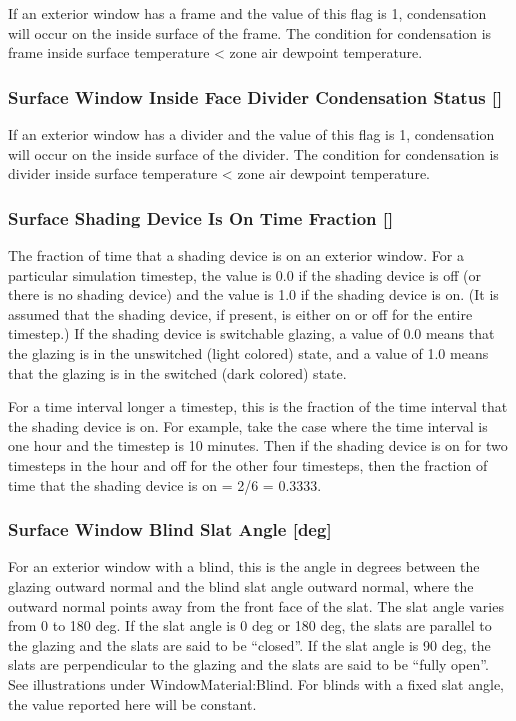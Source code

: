 If an exterior window has a frame and the value of this flag is 1, condensation will occur on the inside surface of the frame. The condition for condensation is frame inside surface temperature \textless{} zone air dewpoint temperature.

\subsubsection{Surface Window Inside Face Divider Condensation Status {[]}}\label{surface-window-inside-face-divider-condensation-status}

If an exterior window has a divider and the value of this flag is 1, condensation will occur on the inside surface of the divider. The condition for condensation is divider inside surface temperature \textless{} zone air dewpoint temperature.

\subsubsection{Surface Shading Device Is On Time Fraction {[]}}\label{surface-shading-device-is-on-time-fraction}

The fraction of time that a shading device is on an exterior window. For a particular simulation timestep, the value is 0.0 if the shading device is off (or there is no shading device) and the value is 1.0 if the shading device is on. (It is assumed that the shading device, if present, is either on or off for the entire timestep.) If the shading device is switchable glazing, a value of 0.0 means that the glazing is in the unswitched (light colored) state, and a value of 1.0 means that the glazing is in the switched (dark colored) state.

For a time interval longer a timestep, this is the fraction of the time interval that the shading device is on. For example, take the case where the time interval is one hour and the timestep is 10 minutes. Then if the shading device is on for two timesteps in the hour and off for the other four timesteps, then the fraction of time that the shading device is on = 2/6 = 0.3333.

\subsubsection{Surface Window Blind Slat Angle {[}deg{]}}\label{surface-window-blind-slat-angle-deg}

For an exterior window with a blind, this is the angle in degrees between the glazing outward normal and the blind slat angle outward normal, where the outward normal points away from the front face of the slat. The slat angle varies from 0 to 180 deg. If the slat angle is 0 deg or 180 deg, the slats are parallel to the glazing and the slats are said to be ``closed''. If the slat angle is 90 deg, the slats are perpendicular to the glazing and the slats are said to be ``fully open''. See illustrations under WindowMaterial:Blind. For blinds with a fixed slat angle, the value reported here will be constant.

